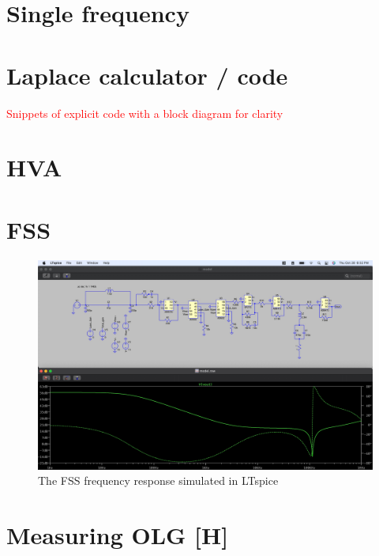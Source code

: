 \section{Single frequency}

\section{Laplace calculator / code}

\textcolor{red}{Snippets of explicit code with a block diagram for clarity}

\section{HVA}

\section{FSS}

\begin{figure}[H]
  \begin{center}
    \includegraphics[width=\textwidth]{figs/ALGAAS/tfs/spice_FSS_tf.pdf}
    \caption{The FSS frequency response simulated in LTspice}
  \end{center}
  \label{fig:spiceFSS}
\end{figure}

\section{Measuring OLG [H]}


